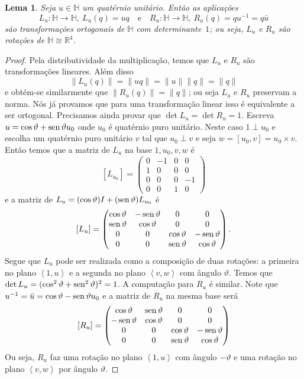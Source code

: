 \documentclass[12pt]{amsart}
\newcommand{\Ha}{\mathbb H}
\newcommand{\R}{\mathbb R}
\DeclareMathOperator{\sen}{\textrm{\rm sen}}
\newtheorem{lemma}[theorem]{Lema}
\theoremstyle{definition}
\begin{document}
\begin{lemma}
    Seja $u\in\Ha$ um quatérnio unitário. Então as aplicações 
    \[
        L_u:\Ha\to\Ha,\ L_u(q)=uq\quad\mbox{e}\quad R_u:\Ha\to\Ha,\ R_u(q)=qu^{-1}=q\bar u
    \]
    são transformações ortogonais de $\Ha$ com determinante~$1$; ou seja, $L_u$ e $R_u$ são 
    rotações de $\Ha\cong \R^4$. 
\end{lemma}
\begin{proof}
    Pela distributividade da multiplicação, temos que $L_u$ e $R_u$ são transformações lineares. Além disso
    \[
        \|L_u(q)\|=\|uq\|=\|u\|\|q\|=\|q\|
    \]
    e obtém-se similarmente que $\|R_u(q)\|=\|q\|$; 
    ou seja $L_u$ e $R_u$ preservam a norma. 
    Nós já provamos que para uma transformação linear isso é equivalente 
    a ser ortogonal. Precisamos ainda provar que $\det L_u=\det R_u=1$. Escreva 
    $u=\cos\vartheta+\sen\vartheta u_0$ onde $u_0$ é quatérnio puro unitário. 
    Neste caso $1\perp u_0$ e escolha um quatérnio puro unitário $v$ tal que 
    $u_0\perp v$ e seja $w=[u_0,v]=u_0\times v$. Então temos que a matriz de $L_u$ na base $1,u_0,v,w$ é 
    \[
        [L_{u_0}]=\begin{pmatrix} 0 & -1 & 0 & 0 \\ 1 & 0 & 0 & 0 \\ 0 & 0 & 0 & -1 \\ 0 & 0 & 1 & 0\end{pmatrix}
    \]
    e
    a matriz de $L_u=(\cos\vartheta)I+(\sen\vartheta) L_{u_0}$ é 
    \[
        [L_u]=\begin{pmatrix} \cos\vartheta & -\sen\vartheta & 0 & 0 \\ \sen\vartheta & \cos\vartheta & 0 & 0 \\ 0 & 0 & \cos\vartheta & -\sen\vartheta \\ 0 & 0 & \sen\vartheta & \cos\vartheta\end{pmatrix}.
    \]
    Segue que $L_u$ pode ser realizada como a composição de duas rotações: a primeira 
    no plano $\left<1,u\right>$ e a segunda no plano $\left<v,w\right>$ com ângulo $\vartheta$. 
    Temos que $\det L_u=(\cos^2\vartheta+\sen^2\vartheta)^2=1$. A computação para $R_u$ é similar. 
    Note que $u^{-1}=\bar u=\cos\vartheta-\sen\vartheta u_0$ e a matriz 
    de $R_u$ na mesma base será 
    \[
        [R_u]=\begin{pmatrix} \cos\vartheta & \sen\vartheta & 0 & 0 \\ -\sen\vartheta & \cos\vartheta & 0 & 0 \\ 0 & 0 & \cos\vartheta & -\sen\vartheta \\ 0 & 0 & \sen\vartheta & \cos\vartheta\end{pmatrix}
    \]
 Ou seja, $R_u$ faz uma rotação no plano $\left<1,u\right>$ com ângulo $-\vartheta$ e uma rotação no plano 
 $\left<v,w\right>$ por ângulo $\vartheta$.
\end{proof}
\end{document}
